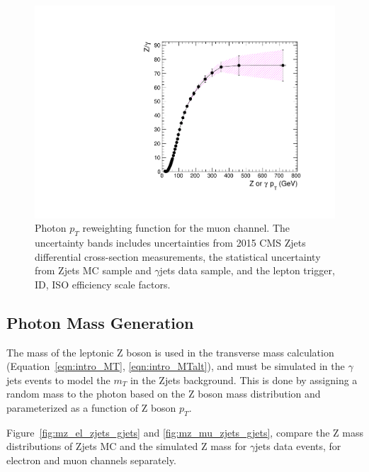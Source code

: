 \begin{figure}[htbp]
\centering
  \includegraphics[width=0.9\linewidth]{figures/study_gjets_data_allcorV2_modify_mu.pdf}
  \caption{Photon $p_T$ reweighting function for the muon channel.
 The uncertainty bands includes uncertainties from 2015 CMS Zjets differential cross-section measurements, the statistical uncertainty from Zjets MC sample and $\gamma$jets data sample, and the lepton trigger, ID, ISO efficiency scale factors.}
  \label{fig:photon_pt_weight_mu}
\end{figure}

\subsection{Photon Mass Generation}\label{sec:gjetm}
The mass of the leptonic Z boson is used in the transverse mass calculation (Equation~\ref{eqn:intro_MT}, \ref{eqn:intro_MTalt}), and must be simulated in the $\gamma$jets events to model the $m_T$ in the Zjets background. This is done by assigning a random mass to the photon based on the Z boson mass distribution and parameterized as a function of Z boson $p_T$.

\vspace{0.3cm}
Figure~\ref{fig:mz_el_zjets_gjets} and \ref{fig:mz_mu_zjets_gjets}, compare the Z mass distributions of Zjets MC and the simulated Z mass for $\gamma$jets data events, for electron and muon channels separately.

